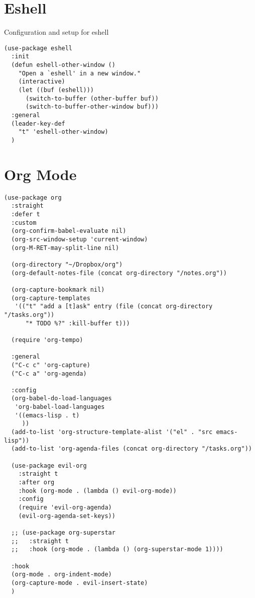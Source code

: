 \documentclass[11pt]{article}
\begin{document}
\section{Eshell}
\label{sec:orgac784d1}
Configuration and setup for eshell
\begin{verbatim}
(use-package eshell
  :init
  (defun eshell-other-window ()
    "Open a `eshell' in a new window."
    (interactive)
    (let ((buf (eshell)))
      (switch-to-buffer (other-buffer buf))
      (switch-to-buffer-other-window buf)))
  :general
  (leader-key-def
    "t" 'eshell-other-window)
  )
\end{verbatim}
\section{Org Mode}
\label{sec:orgd6c83d5}
\begin{verbatim}
(use-package org
  :straight
  :defer t
  :custom
  (org-confirm-babel-evaluate nil)
  (org-src-window-setup 'current-window)
  (org-M-RET-may-split-line nil)

  (org-directory "~/Dropbox/org")
  (org-default-notes-file (concat org-directory "/notes.org"))

  (org-capture-bookmark nil)
  (org-capture-templates
   '(("t" "add a [t]ask" entry (file (concat org-directory "/tasks.org"))
      "* TODO %?" :kill-buffer t)))

  (require 'org-tempo)

  :general
  ("C-c c" 'org-capture)
  ("C-c a" 'org-agenda)

  :config
  (org-babel-do-load-languages
   'org-babel-load-languages
   '((emacs-lisp . t)
     ))
  (add-to-list 'org-structure-template-alist '("el" . "src emacs-lisp"))
  (add-to-list 'org-agenda-files (concat org-directory "/tasks.org"))

  (use-package evil-org
    :straight t
    :after org
    :hook (org-mode . (lambda () evil-org-mode))
    :config
    (require 'evil-org-agenda)
    (evil-org-agenda-set-keys))

  ;; (use-package org-superstar
  ;;   :straight t
  ;;   :hook (org-mode . (lambda () (org-superstar-mode 1))))

  :hook
  (org-mode . org-indent-mode)
  (org-capture-mode . evil-insert-state)
  )
\end{verbatim}
\end{document}
